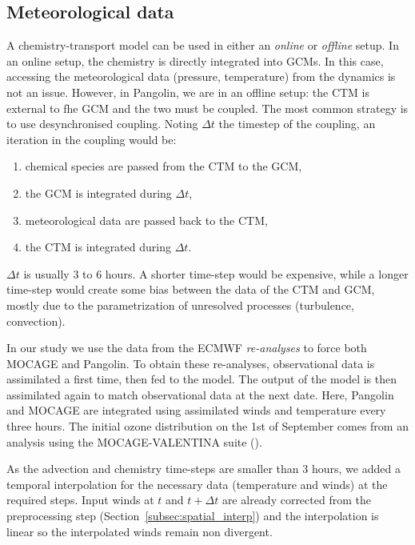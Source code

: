 \subsection{Meteorological data}
A chemistry-transport model can be used in either an \textit{online} or
\textit{offline} setup. In an online setup, the chemistry is directly integrated
into \glspl{GCM}. In this case, accessing the
meteorological data (pressure, temperature) from the dynamics is not an issue.
However, in Pangolin, we are in an offline setup: the \gls{CTM} is external to
fhe \gls{GCM} and the two must be coupled. The most common strategy is to use
desynchronised coupling. Noting $\Delta t$ the timestep of the coupling, an
iteration in the coupling would be:
\begin{enumerate}
\item chemical species are passed from the CTM to the GCM,
\item the GCM is integrated during $\Delta t$,
\item meteorological data are passed back to the CTM,
\item the CTM is integrated during $\Delta t$.
\end{enumerate}
$\Delta t$ is usually 3 to 6 hours. A shorter time-step would be expensive,
while a longer time-step would create some bias between the data of the CTM and
GCM, mostly due to the parametrization of unresolved processes (turbulence,
convection). 

In our study we use the data from the ECMWF \textit{re-analyses} to force both
MOCAGE and Pangolin. To obtain these re-analyses, observational data is
assimilated a first time, then fed to the model. The output of the model is then
assimilated again to match observational data at the next date.  Here, Pangolin
and MOCAGE are integrated using assimilated winds and temperature every three
hours. The initial ozone distribution on the 1st of September comes from an
analysis using the MOCAGE-VALENTINA suite (\cite{Emili2014}).

As the advection and chemistry time-steps are smaller than 3
hours, we added a temporal interpolation for the necessary data (temperature and
winds) at the required steps. Input winds at $t$ and $t+\Delta t$ are already corrected from
the preprocessing step (Section~\ref{subsec:spatial_interp}) and the
interpolation is linear so the interpolated winds remain non divergent.

